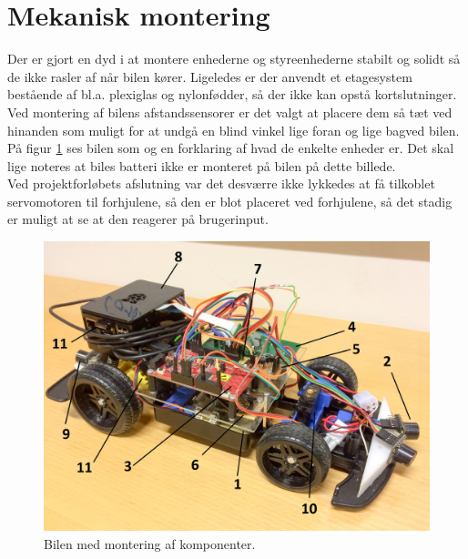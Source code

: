 \section{Mekanisk montering}

Der er gjort en dyd i at montere enhederne og styreenhederne stabilt og solidt så de ikke rasler af når bilen kører. Ligeledes er der anvendt et etagesystem bestående af bl.a. plexiglas og nylonfødder, så der ikke kan opstå kortslutninger. Ved montering af bilens afstandssensorer er det valgt at placere dem så tæt ved hinanden som muligt for at undgå en blind vinkel lige foran og lige bagved bilen. På figur \ref{fig:billede_af_bil} ses bilen som og en forklaring af hvad de enkelte enheder er. Det skal lige noteres at biles batteri ikke er monteret på bilen på dette billede.\\
Ved projektforløbets afslutning var det desværre ikke lykkedes at få tilkoblet servomotoren til forhjulene, så den er blot placeret ved forhjulene, så det stadig er muligt at se at den reagerer på brugerinput.

\begin{figure}[h]
\centering
\includegraphics[width=\textwidth -1cm]{../fig/billeder/billede_af_bil.jpg}
\caption{Bilen med montering af komponenter.}
\label{fig:billede_af_bil}
\end{figure}

